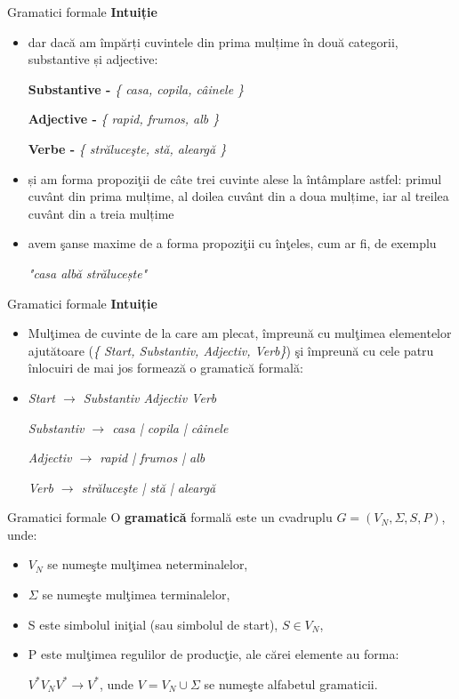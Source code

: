 \documentclass[pdf]{beamer}
\begin{document}
\begin{frame}{Gramatici formale}
\textbf{Intuiție}
\begin{itemize}
\item
dar dacă am împărți cuvintele din prima mulțime în două categorii, substantive și adjective:

\textbf{Substantive - }\textit{ \{ casa, copila, câinele \} }

\textbf{Adjective - }\textit{ \{ rapid, frumos, alb \} }

\textbf{Verbe - }\textit{ \{ străluceşte, stă, aleargă \} }

\item
și am forma propoziţii de câte trei cuvinte alese la întâmplare astfel: primul cuvânt din prima mulțime, al doilea cuvânt din a doua mulțime, iar al treilea cuvânt din a treia mulțime
\item
avem şanse maxime de a forma propoziţii cu înţeles, cum ar fi, de exemplu

\textit{ "casa albă strălucește" }
\end{itemize}
\end{frame}



\begin{frame}{Gramatici formale}
\textbf{Intuiție}
\begin{itemize}
\item
Mulţimea de cuvinte de la care am plecat, împreună cu mulţimea elementelor ajutătoare (\textit{\{ Start, Substantiv, Adjectiv, Verb\}}) şi împreună cu cele patru înlocuiri de mai jos formează o gramatică formală:
\item
\textit{ Start $\rightarrow$ Substantiv Adjectiv Verb }

\textit{ Substantiv $\rightarrow$ casa | copila | câinele }

\textit{ Adjectiv $\rightarrow$ rapid | frumos | alb }

\textit{ Verb $\rightarrow$ străluceşte | stă | aleargă }
\end{itemize}
\end{frame}



\begin{frame}{Gramatici formale}
O \textbf{gramatică} formală este un cvadruplu $G = (V_{N}, \Sigma, S, P)$, unde:
\begin{itemize}
\item
$V_{N}$ se numeşte mulţimea neterminalelor,
\item
$\Sigma$ se numeşte mulţimea terminalelor,
\item
S este simbolul iniţial (sau simbolul de start), $S \in V_{N}$,
\item
P este mulţimea regulilor de producţie, ale cărei elemente au forma:

$V^{*}V_{N}V^{*} \rightarrow V^{*}$, unde $V = V_{N} \cup \Sigma$ se numeşte alfabetul gramaticii.
\end{itemize}
\end{frame}
\end{document}
